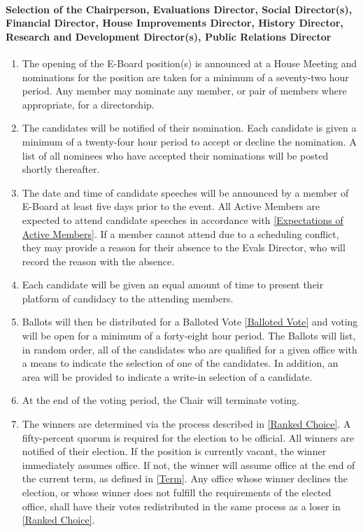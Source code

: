 \documentclass{article}
\newcommand{\asubsubsection}[1]{\paragraph{#1} \label{#1}}
\begin{document}
\asubsubsection{Selection of the Chairperson, Evaluations Director, Social Director(s), Financial Director, House Improvements Director, History Director,  Research and Development Director(s), Public Relations Director}
\begin{enumerate}
	\item The opening of the E-Board position(s) is announced at a House Meeting and nominations for the position are taken for a minimum of a seventy-two hour period.
	      Any member may nominate any member, or pair of members where appropriate, for a directorship.
	\item The candidates will be notified of their nomination.
	      Each candidate is given a minimum of a twenty-four hour period to accept or decline the nomination.
	      A list of all nominees who have accepted their nominations will be posted shortly thereafter.
	\item The date and time of candidate speeches will be announced by a member of E-Board at least five days prior to the event.
	      All Active Members are expected to attend candidate speeches in accordance with \ref{Expectations of Active Members}.
	      If a member cannot attend due to a scheduling conflict, they may provide a reason for their absence to the Evals Director, who will record the reason with the absence.
	\item Each candidate will be given an equal amount of time to present their platform of candidacy to the attending members.
	\item Ballots will then be distributed for a Balloted Vote \ref{Balloted Vote} and voting will be open for a minimum of a forty-eight hour period.
	      The Ballots will list, in random order, all of the candidates who are qualified for a given office with a means to indicate the selection of one of the candidates.
	      In addition, an area will be provided to indicate a write-in selection of a candidate.
	\item At the end of the voting period, the Chair will terminate voting.
	\item The winners are determined via the process described in \ref{Ranked Choice}.
	      A fifty-percent quorum is required for the election to be official.
	      All winners are notified of their election.
	      If the position is currently vacant, the winner immediately assumes office.
	      If not, the winner will assume office at the end of the current term, as defined in \ref{Term}.
	      Any office whose winner declines the election, or whose winner does not fulfill the requirements of the elected office, shall have their votes redistributed in the same process as a loser in \ref{Ranked Choice}.
\end{enumerate}
\end{document}
